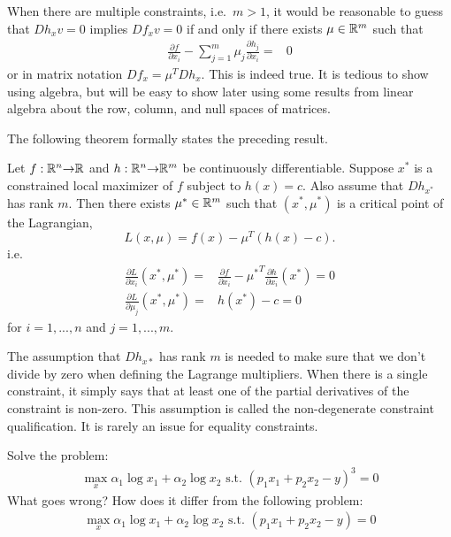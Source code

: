 When there are multiple constraints, i.e.\ $m>1$, it would be
reasonable to guess that $Dh_x v = 0$ implies $Df_x v = 0$ if and only
if there exists $\mu \in \mathbb{R}^m$ such that 
\begin{align*}
  \frac{\partial f}{\partial x_i} - \sum_{j=1}^m \mu_j  \frac{\partial
    h_j}{\partial x_i} = & 0 
\end{align*}
or in matrix notation $Df_x = \mu^T Dh_x$. This is indeed true. It is
tedious to show using algebra, but will be easy to show later using
some results from linear algebra about the row, column, and null
spaces of matrices. 

The following theorem formally states the preceding result.
\begin{theorem} \label{thm:econ} Let $f:\mathbb{R}^n {\rightarrow} \mathbb{R}$ and $h: \mathbb{R}^n {\rightarrow}
  \mathbb{R}^m$ be continuously differentiable. Suppose $x^*$ is a constrained
  local maximizer of $f$ subject to $h(x) = c$. Also assume that
  $Dh_{x^*}$ has rank $m$. Then there exists $\mu^* \in \mathbb{R}^m$ such
  that $(x^*, \mu^*)$ is a critical point of the Lagrangian,
  \[ L(x,\mu) = f(x) - \mu^T (h(x) - c). \]
  i.e.
  \begin{align*}
    \frac{\partial L}{\partial x_i}(x^*,\mu^*) = & \frac{\partial
      f}{\partial x_i} - {\mu^*}^T \frac{\partial h}{\partial
      x_i}(x^*) = 0 \\
    \frac{\partial L}{\partial \mu_j}(x^*,\mu^*) = & h(x^*) -
    c = 0
  \end{align*}
  for $i = 1, ..., n$ and $j=1,...,m$.
\end{theorem}
The assumption that $Dh_{x*}$ has rank $m$ is needed to make sure that
we don't divide by zero when defining the Lagrange multipliers. When
there is a single constraint, it simply says that at least one of the
partial derivatives of the constraint is non-zero. This assumption is
called the non-degenerate constraint qualification. It is rarely an
issue for equality constraints.

\begin{exercise}
  Solve the problem:
  \begin{align*}
    \max_{x} \alpha_1 \log x_1 + \alpha_2 \log x_2 \text{ s.t. } (p_1
    x_1 + p_2 x_2 - y)^3 = 0
  \end{align*}
  What goes wrong? How does it differ from the following problem:
  \begin{align*}
    \max_{x} \alpha_1 \log x_1 + \alpha_2 \log x_2 \text{ s.t. } (p_1
    x_1 + p_2 x_2 - y) = 0
  \end{align*}  
\end{exercise}

